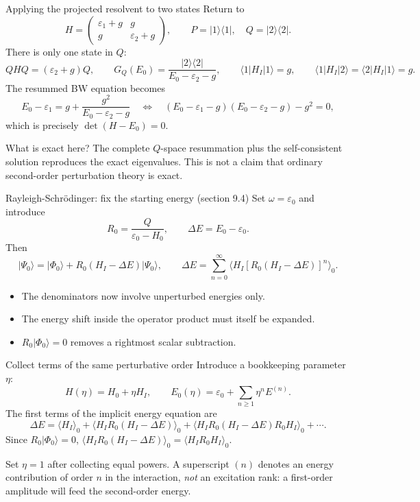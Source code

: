 \documentclass[aspectratio=169,10pt]{beamer}
\newcommand{\warnbox}[1]{%
  \begin{tcolorbox}[colback=palewarm,colframe=warm,title={\bfseries A trap to avoid}]
  #1
  \end{tcolorbox}}
\newcommand{\ket}[1]{\vert #1\rangle}
\newcommand{\bra}[1]{\langle #1\vert}
\newcommand{\mel}[3]{\langle #1\lvert #2\rvert #3\rangle}
\newcommand{\av}[1]{\langle #1\rangle_0}
\newcommand{\ph}{\Phi_0}
\newcommand{\Psizero}{\Psi_0}
\begin{document}
\begin{frame}{Applying the projected resolvent to two states}
Return to
\[
H=\begin{pmatrix}\varepsilon_1+g&g\\g&\varepsilon_2+g\end{pmatrix},
\qquad P=\ket{1}\bra{1},\quad Q=\ket{2}\bra{2}.
\]
There is only one state in \(Q\):
\[
QHQ=(\varepsilon_2+g)Q,\qquad
G_Q(E_0)=\frac{\ket{2}\bra{2}}{E_0-\varepsilon_2-g},
\qquad
\mel{1}{H_I}{1}=g,\qquad
\mel{1}{H_I}{2}=\mel{2}{H_I}{1}=g.
\]
The resummed BW equation becomes
\[
E_0-\varepsilon_1=g+\frac{g^2}{E_0-\varepsilon_2-g}
\quad\Longleftrightarrow\quad
\boxed{(E_0-\varepsilon_1-g)(E_0-\varepsilon_2-g)-g^2=0,}
\]
which is precisely \(\det(H-E_0)=0\).
\begin{block}{What is exact here?}
The complete \(Q\)-space resummation plus the self-consistent solution reproduces the exact eigenvalues. This is not a claim that ordinary second-order perturbation theory is exact.
\end{block}
\end{frame}

\begin{frame}{Rayleigh-Schr\"odinger: fix the starting energy (section 9.4)}
Set \(\omega=\varepsilon_0\) and introduce
\[
R_0=\frac{Q}{\varepsilon_0-H_0},\qquad
\Delta E=E_0-\varepsilon_0 .
\]
Then
\[
\ket{\Psizero}=\ket{\ph}+R_0(H_I-\Delta E)\ket{\Psizero},
\qquad
\boxed{\Delta E=\sum_{n=0}^{\infty}
\av{H_I\left[R_0(H_I-\Delta E)\right]^n}.}
\]
\begin{itemize}
\item The denominators now involve unperturbed energies only.
\item The energy shift inside the operator product must itself be expanded.
\item \(R_0\ket{\ph}=0\) removes a rightmost scalar subtraction.
\end{itemize}
\end{frame}

\begin{frame}{Collect terms of the same perturbative order}
Introduce a bookkeeping parameter \(\eta\):
\[
H(\eta)=H_0+\eta H_I,\qquad
E_0(\eta)=\varepsilon_0+\sum_{n\ge1}\eta^nE^{(n)}.
\]
The first terms of the implicit energy equation are
\[
\Delta E=\av{H_I}
+\av{H_I R_0(H_I-\Delta E)}
+\av{H_I R_0(H_I-\Delta E)R_0H_I}+\cdots .
\]
Since \(R_0\ket{\ph}=0\),
\(\av{H_I R_0(H_I-\Delta E)}=\av{H_I R_0H_I}\).
\warnbox{Set \(\eta=1\) after collecting equal powers. A superscript \((n)\) denotes an energy contribution of order \(n\) in the interaction, \emph{not} an excitation rank: a first-order amplitude will feed the second-order energy.}
\end{frame}
\end{document}
